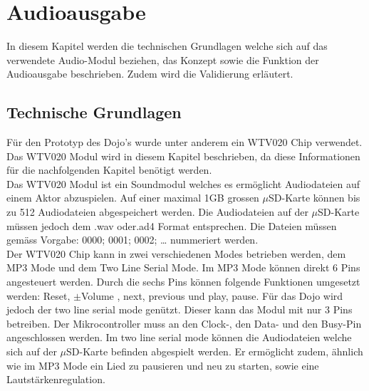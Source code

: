 \chapter{Audioausgabe}
\label{Audioausgabe}
\thispagestyle{fancy}  
In diesem Kapitel werden die technischen Grundlagen welche sich auf das verwendete Audio-Modul beziehen, das Konzept sowie die Funktion der Audioausgabe beschrieben. Zudem wird die Validierung erläutert.
\section{Technische Grundlagen}
Für den Prototyp des Dojo’s wurde unter anderem ein WTV020 Chip verwendet. Das WTV020 Modul wird in diesem Kapitel beschrieben, da diese Informationen für die nachfolgenden Kapitel benötigt werden.\\
Das WTV020 Modul ist ein Soundmodul welches es ermöglicht Audiodateien auf einem Aktor abzuspielen. Auf einer maximal 1GB grossen $\mu$SD-Karte können bis zu 512 Audiodateien abgespeichert werden. Die Audiodateien auf der $\mu$SD-Karte müssen jedoch dem .wav oder.ad4 Format entsprechen. Die Dateien müssen gemäss Vorgabe: 0000; 0001; 0002; … nummeriert werden.\\
Der WTV020 Chip kann in zwei verschiedenen Modes betrieben werden, dem MP3 Mode und dem Two Line Serial Mode. Im MP3 Mode können direkt 6 Pins angesteuert werden. Durch die sechs Pins können folgende Funktionen umgesetzt werden: Reset, $\pm$Volume , next, previous und play, pause. 
Für das Dojo wird jedoch der two line serial mode genützt. Dieser kann das Modul mit nur 3 Pins betreiben. Der Mikrocontroller muss an den Clock-, den Data- und den Busy-Pin angeschlossen werden. Im two line serial mode können die Audiodateien welche sich auf der $\mu$SD-Karte befinden abgespielt werden. Er ermöglicht zudem, ähnlich wie im MP3 Mode ein Lied zu pausieren und neu zu starten, sowie eine Lautstärkenregulation.
